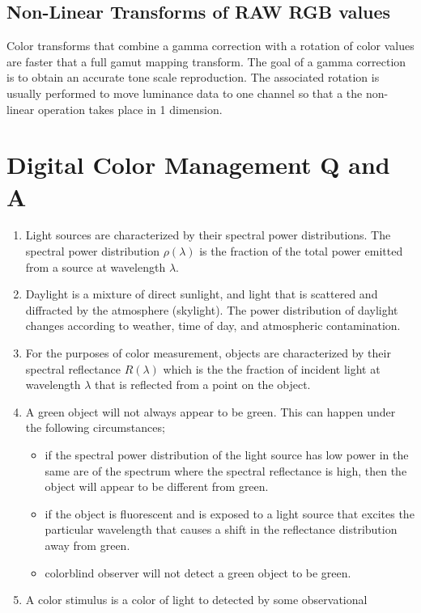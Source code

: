 \subsection{Non-Linear Transforms of RAW RGB values}
Color transforms that combine a gamma correction with a rotation of color values are faster that a full gamut mapping transform. The goal of a gamma correction is to obtain an accurate tone scale reproduction.  The associated rotation is usually performed to move luminance data to one channel so that a the non-linear operation takes place in 1 dimension.


\section{Digital Color Management Q and A}

\begin{enumerate}
\item Light sources are characterized by their spectral power
distributions.  The spectral power distribution $\rho(\lambda)$ is
the fraction of the total power emitted from a source at
wavelength $\lambda$. \item Daylight is a mixture of direct
sunlight, and light that is scattered and diffracted by the
atmosphere (skylight).  The power distribution of daylight changes
according to weather, time of day, and atmospheric contamination.
\item For the purposes of color measurement, objects are
characterized by their spectral reflectance $R(\lambda)$ which is
the the fraction of incident light at wavelength $\lambda$ that is
reflected from a point on the object. \item A green object will
not always appear to be green.  This can happen under the
following circumstances;
\begin{itemize} \item if the spectral power distribution
of the light source has low power in the same are of the spectrum
where the spectral reflectance is high, then the object will
appear to be different from green. \item if the object is
fluorescent and is exposed to a light source that excites the
particular wavelength that causes a shift in the reflectance
distribution away from green.  \item colorblind observer will not
detect a green object to be green.\end{itemize} \item A color
stimulus is a color of light to detected by some observational

\end{enumerate}
